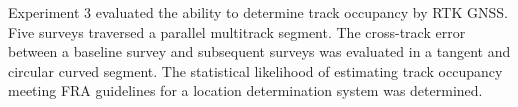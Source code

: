 Experiment 3 evaluated the ability to determine track occupancy by RTK GNSS. Five surveys traversed a parallel multitrack segment. The cross-track error between a baseline survey and subsequent surveys was evaluated in a tangent and circular curved segment. The statistical likelihood of estimating track occupancy meeting FRA guidelines for a location determination system was determined.